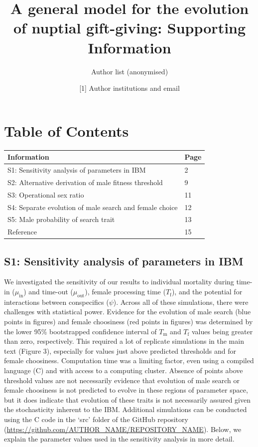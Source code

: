 \documentclass[
]{article}
\title{A general model for the evolution of nuptial gift-giving:
Supporting Information}
\author{Author list (anonymised)}
\date{{[}1{]} Author institutions and email}
\begin{document}
\maketitle

\hypertarget{table-of-contents}{%
\section{Table of Contents}\label{table-of-contents}}

\begin{longtable}[]{@{}ll@{}}
\toprule
Information & Page \\
\midrule
\endhead
S1: Sensitivity analysis of parameters in IBM & 2 \\
S2: Alternative derivation of male fitness threshold & 9 \\
S3: Operational sex ratio & 11 \\
S4: Separate evolution of male search and female choice & 12 \\
S5: Male probability of search trait & 13 \\
Reference & 15 \\
\bottomrule
\end{longtable}

\clearpage

\hypertarget{s1-sensitivity-analysis-of-parameters-in-ibm}{%
\subsection{S1: Sensitivity analysis of parameters in
IBM}\label{s1-sensitivity-analysis-of-parameters-in-ibm}}

We investigated the sensitivity of our results to individual mortality
during time-in (\(\mu_{\mathrm{in}}\)) and time-out
(\(\mu_{\mathrm{out}}\)), female processing time (\(T_{\mathrm{f}}\)),
and the potential for interactions between conspecifics (\(\psi\)).
Across all of these simulations, there were challenges with statistical
power. Evidence for the evolution of male search (blue points in
figures) and female choosiness (red points in figures) was determined by
the lower 95\% bootstrapped confidence interval of \(T_{\mathrm{m}}\)
and \(T_{\mathrm{f}}\) values being greater than zero, respectively.
This required a lot of replicate simulations in the main text (Figure
3), especially for values just above predicted thresholds and for female
choosiness. Computation time was a limiting factor, even using a
compiled language (C) and with access to a computing cluster. Absence of
points above threshold values are not necessarily evidence that
evolution of male search or female choosiness is not predicted to evolve
in these regions of parameter space, but it does indicate that evolution
of these traits is not necessarily assured given the stochasticity
inherent to the IBM. Additional simulations can be conducted using the C
code in the `src' folder of the GitHub repository
(\url{https://github.com/AUTHOR_NAME/REPOSITORY_NAME}). Below, we
explain the parameter values used in the sensitivity analysis in more
detail.
\end{document}
